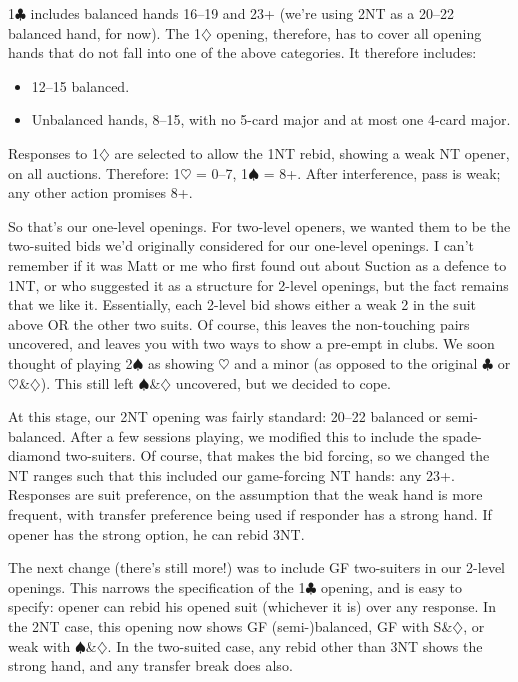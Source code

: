 \documentclass[a4paper,14pt]{extarticle}
\begin{document}
1$\clubsuit$ includes balanced hands 16--19 and 23+ (we're using 2NT as a 20--22 balanced
hand, for now).  The 1$\diamondsuit$ opening, therefore, has to cover all opening hands that
do not fall into one of the above categories.  It therefore includes:

\begin{itemize}
\item 12--15 balanced.
\item Unbalanced hands, 8--15, with no 5-card major and at most one 4-card
      major.
\end{itemize}

Responses to 1$\diamondsuit$ are selected to allow the 1NT rebid, showing a weak NT opener,
on all auctions.  Therefore: 1$\heartsuit$ = 0--7, 1$\spadesuit$ = 8+.  After interference, pass is
weak; any other action promises 8+.

So that's our one-level openings.  For two-level openers, we wanted them to be
the two-suited bids we'd originally considered for our one-level openings.  I
can't remember if it was Matt or me who first found out about Suction as a
defence to 1NT, or who suggested it as a structure for 2-level openings, but
the fact remains that we like it.  Essentially, each 2-level bid shows either a
weak 2 in the suit above OR the other two suits.  Of course, this leaves the
non-touching pairs uncovered, and leaves you with two ways to show a pre-empt
in clubs.  We soon thought of playing 2$\spadesuit$ as showing $\heartsuit$ and
a minor (as opposed to the original $\clubsuit$ or
		$\heartsuit$\&$\diamondsuit$).  This still left
$\spadesuit$\&$\diamondsuit$ uncovered, but we decided to cope.

At this stage, our 2NT opening was fairly standard: 20--22 balanced or
semi-balanced.  After a few sessions playing, we modified this to include the
spade-diamond two-suiters.  Of course, that makes the bid forcing, so we
changed the NT ranges such that this included our game-forcing NT hands: any
23+.  Responses are suit preference, on the assumption that the weak hand is
more frequent, with transfer preference being used if responder has a strong
hand.  If opener has the strong option, he can rebid 3NT.

The next change (there's still more!) was to include GF two-suiters in our
2-level openings.  This narrows the specification of the 1$\clubsuit$ opening, and is
easy to specify: opener can rebid his opened suit (whichever it is) over any
response.  In the 2NT case, this opening now shows GF (semi-)balanced, GF with
S\&$\diamondsuit$, or weak with $\spadesuit$\&$\diamondsuit$.  In the two-suited case, any rebid other than 3NT shows
the strong hand, and any transfer break does also.
\end{document}
